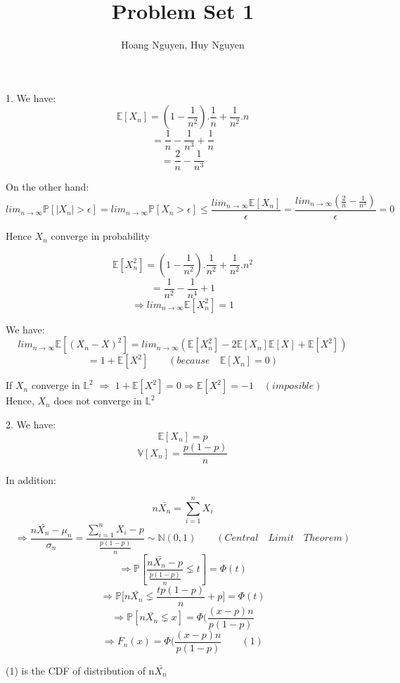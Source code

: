 \documentclass[10pt]{article}
\newenvironment{problem}[2][Problem]{\begin{trivlist}
\item[\hskip \labelsep {\bfseries #1}\hskip \labelsep {\bfseries #2.}]}{\end{trivlist}}
\begin{document}
\title{Problem Set 1}
\author{Hoang Nguyen, Huy Nguyen}
\maketitle
    
\begin{problem}{1}
\item 1.
We have:\\
\[\mathbb{E}[X_n]=(1-\frac{1}{n^2}).\frac{1}{n}+\frac{1}{n^2}.n\]
\[=\frac{1}{n}-\frac{1}{n^3}+\frac{1}{n}\]
\[=\frac{2}{n}-\frac{1}{n^3}\]

On the other hand:
\[lim_{n \rightarrow \infty}\mathbb{P}[|X_n| > \epsilon]=lim_{n \rightarrow \infty}\mathbb{P}[X_n > \epsilon]\leq \frac{lim_{n \rightarrow \infty}\mathbb{E}[X_n]}{\epsilon}=\frac{lim_{n \rightarrow \infty}(\frac{2}{n}-\frac{1}{n^3})}{\epsilon}=0\]


Hence $X_n$ converge in probability

\[\mathbb{E}[X_n^2]=(1-\frac{1}{n^2}).\frac{1}{n^2}+\frac{1}{n^2}.n^2\]
\[=\frac{1}{n^2}-\frac{1}{n^4}+1\]
\[\Rightarrow lim_{n \rightarrow \infty}\mathbb{E}[X_n^2]=1\] 

We have: \\
\[lim_{n \rightarrow \infty}\mathbb{E}[(X_n-X)^2]=lim_{n \rightarrow \infty}(\mathbb{E}[X_n^2]-2\mathbb{E}[X_n]\mathbb{E}[X]+\mathbb{E}[X^2])\]
\[=1+\mathbb{E}[X^2]\qquad (because\quad \mathbb{E}[X_n]=0)\]

If $X_n$ converge in $\mathbb{L}^2$ $\Rightarrow$ $1+\mathbb{E}[X^2]=0 \Rightarrow \mathbb{E}[X^2]=-1 \quad (imposible)$\\

Hence, $X_n$ does not converge in $\mathbb{L}^2$

\item 2.
We have:\\
\[\mathbb{E}[X_n]=p\]
\[\mathbb{V}[X_n]=\frac{p(1-p)}{n}\]

In addition:

\[n\bar{X_n}=\sum_{i=1}^{n} X_i\]
\[\Rightarrow \frac{n\bar{X_n}-\mu_n}{\sigma_n}=\frac{\sum_{i=1}^{n} X_i-p}{\frac{p(1-p)}{n}}\sim\mathbb{N}(0,1)\qquad (Central \quad Limit \quad Theorem)\]
\[\Rightarrow \mathbb{P}[\frac{n\bar{X_n}-p}{\frac{p(1-p)}{n}}\lneq t]=\Phi(t)\]
\[\Rightarrow \mathbb{P}\Big[ n\bar{X_n} \lneq \frac{tp(1-p)}{n}+p \Big]=\Phi(t)\]
\[\Rightarrow \mathbb{P}[ n\bar{X_n} \lneq x]=\Phi(\frac{(x-p)n}{p(1-p)}\]
\[\Rightarrow F_n(x)=\Phi(\frac{(x-p)n}{p(1-p)} \qquad (1)\]

(1) is the CDF of distribution of n$\bar{X_n}$


\end{problem}
\end{document}
